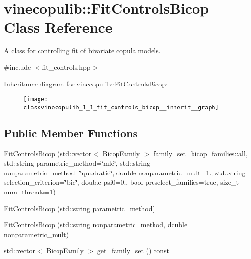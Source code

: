 \hypertarget{classvinecopulib_1_1_fit_controls_bicop}{}\section{vinecopulib\+:\+:Fit\+Controls\+Bicop Class Reference}
\label{classvinecopulib_1_1_fit_controls_bicop}


A class for controlling fit of bivariate copula models.  




{\ttfamily \#include $<$fit\+\_\+controls.\+hpp$>$}



Inheritance diagram for vinecopulib\+:\+:Fit\+Controls\+Bicop\+:
\nopagebreak
\begin{figure}[H]
\begin{center}
\leavevmode
\texttt{[image: classvinecopulib\_1\_1\_fit\_controls\_bicop\_\_inherit\_\_graph]}
\end{center}
\end{figure}
\subsection*{Public Member Functions}
\begin{DoxyCompactItemize}
\item 
\hyperlink{classvinecopulib_1_1_fit_controls_bicop_a005b6b7011f1472207dd506127ac1cd9}{Fit\+Controls\+Bicop} (std\+::vector$<$ \hyperlink{namespacevinecopulib_a42e95cc06d33896199caab0c11ad44f3}{Bicop\+Family} $>$ family\+\_\+set=\hyperlink{namespacevinecopulib_1_1bicop__families_a5214a513f41ec23b74782aab96ea6774}{bicop\+\_\+families\+::all}, std\+::string parametric\+\_\+method=\char`\"{}mle\char`\"{}, std\+::string nonparametric\+\_\+method=\char`\"{}quadratic\char`\"{}, double nonparametric\+\_\+mult=1., std\+::string selection\+\_\+criterion=\char`\"{}bic\char`\"{}, double psi0=0., bool preselect\+\_\+families=true, size\+\_\+t num\+\_\+threads=1)
\item 
\hyperlink{classvinecopulib_1_1_fit_controls_bicop_a6a2fc00794c9dd9d598ac9948e7b98e4}{Fit\+Controls\+Bicop} (std\+::string parametric\+\_\+method)
\item 
\hyperlink{classvinecopulib_1_1_fit_controls_bicop_af1dfc8d80eba3ce6cfa8bf21fe49cc1a}{Fit\+Controls\+Bicop} (std\+::string nonparametric\+\_\+method, double nonparametric\+\_\+mult)
\end{DoxyCompactItemize}
\begin{DoxyCompactItemize}
\item 
std\+::vector$<$ \hyperlink{namespacevinecopulib_a42e95cc06d33896199caab0c11ad44f3}{Bicop\+Family} $>$ \hyperlink{classvinecopulib_1_1_fit_controls_bicop_a8ea096aec62cbca55641941c9b4cf8f8}{get\+\_\+family\+\_\+set} () const 
\end{DoxyCompactItemize}


